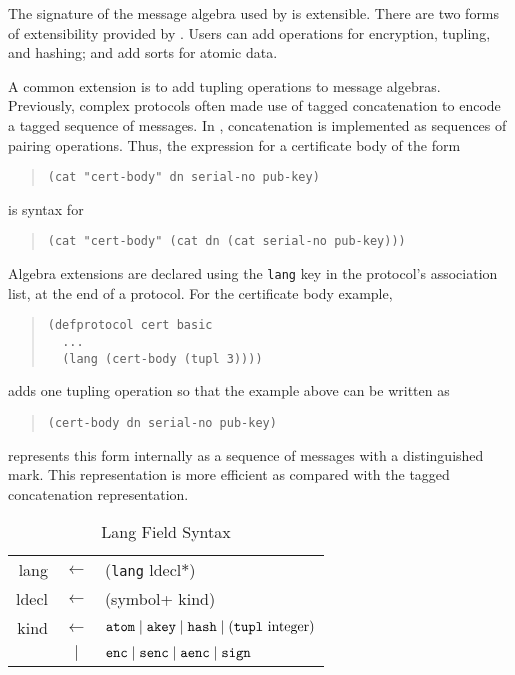 \documentclass[12pt]{article}
\begin{document}
The signature of the message algebra used by {\cpsa} is extensible.
There are two forms of extensibility provided by {\cpsa}.  Users can
add operations for encryption, tupling, and hashing; and
add sorts for atomic data.

A common extension is to add tupling operations to message algebras.
Previously, complex protocols often made use of tagged concatenation
to encode a tagged sequence of messages.  In {\cpsa}, concatenation is
implemented as sequences of pairing operations.  Thus, the expression
for a certificate body of the form
\begin{quote}
\begin{verbatim}
(cat "cert-body" dn serial-no pub-key)
\end{verbatim}
\end{quote}
is syntax for
\begin{quote}
\begin{verbatim}
(cat "cert-body" (cat dn (cat serial-no pub-key)))
\end{verbatim}
\end{quote}

Algebra extensions are declared using the \texttt{lang} key in the
protocol's association list, at the end of a protocol.  For the
certificate body example,
\begin{quote}
\begin{verbatim}
(defprotocol cert basic
  ...
  (lang (cert-body (tupl 3))))
\end{verbatim}
\end{quote}
adds one tupling operation so that the example above can be written as
\begin{quote}
\begin{verbatim}
(cert-body dn serial-no pub-key)
\end{verbatim}
\end{quote}
{\cpsa} represents this form internally as a sequence of messages with a
distinguished mark.  This representation is more efficient as compared
with the tagged concatenation representation.

\begin{table}
\newcommand{\sym}[1]{\textup{\texttt{#1}}}
\begin{center}\scshape
\begin{tabular}{rcl}
  lang&$\leftarrow$&(\sym{lang} ldecl$\ast$)
  \\ ldecl&$\leftarrow$&(symbol+ kind)
  \\ kind&$\leftarrow$&
  $\sym{atom}\mid\sym{akey}\mid\sym{hash}\mid\mbox{(\sym{tupl}
    integer)}$
  \\ &$\mid$&$\sym{enc}\mid\sym{senc}\mid\sym{aenc}\mid\sym{sign}$
\end{tabular}
\end{center}
\caption{Lang Field Syntax}\label{tab:lang field syntax}
\end{table}
\end{document}
